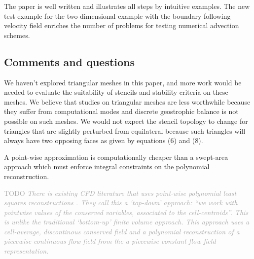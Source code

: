 \documentclass[times]{elsarticle}
\newcommand{\TODO}[1]{\textcolor{darkgray}{TODO \textit{#1}}}
\begin{document}
The paper is well written and illustrates all steps by intuitive examples. The new test example
for the two-dimensional example with the boundary following velocity field enriches the number of
problems for testing numerical advection schemes.

\subsection*{Comments and questions}

\begin{quotation}
\begin{comment}
\setcounter{commenti}{0}
\item Can you comment on the stencil for triangular grids. In case of a slightly perturbed triangular grid
with  equilateral triangles the stencil changes in comparison the unperturbed case.
\end{comment}
\end{quotation}
We haven't explored triangular meshes in this paper, and more work would be needed to evaluate the suitability of stencils and stability criteria on these meshes.
We believe that studies on triangular meshes are less worthwhile because they suffer from computational modes \citep{weller2012} and discrete geostrophic balance is not possible \citep{weller2009} on such meshes.
We would not expect the stencil topology to change for triangles that are slightly perturbed from equilateral because such triangles will always have two opposing faces as given by equations (6) and (8).

\begin{quotation}
\begin{comment}
\item Why do you prefer the point wise approximation?
\end{comment}
\end{quotation}
A point-wise approximation is computationally cheaper than a swept-area approach which must enforce integral constraints on the polynomial reconstruction.

\TODO{There is existing CFD literature that uses point-wise polynomial least squares reconstructions \citep{cuetofelgueroso2006,cuetofelgueroso2007}.  They call this a `top-down' approach: ``we work with \emph{pointwise} values of the conserved variables, associated to the cell-centroids''.  This is unlike the traditional `bottom-up' finite volume approach.  This approach uses a cell-average, discontinous conserved field and a polynomial reconstruction of a piecewise continuous flow field from the a piecewise constant flow field representation.}
\end{document}
